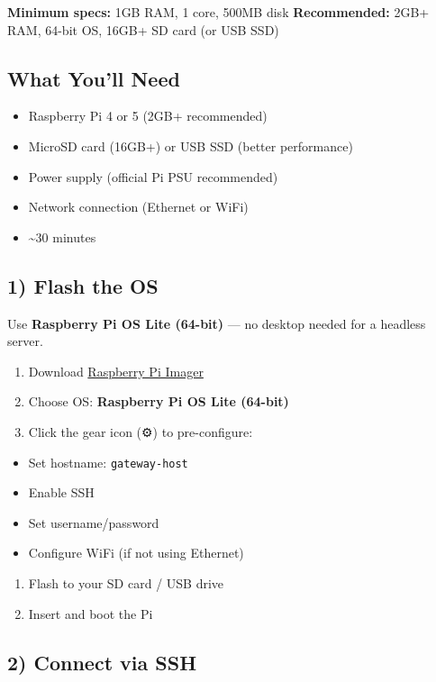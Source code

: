 \textbf{Minimum specs:} 1GB RAM, 1 core, 500MB disk
\textbf{Recommended:} 2GB+ RAM, 64-bit OS, 16GB+ SD card (or USB SSD)

\subsection{What You'll Need}


\begin{itemize}
  \item Raspberry Pi 4 or 5 (2GB+ recommended)
  \item MicroSD card (16GB+) or USB SSD (better performance)
  \item Power supply (official Pi PSU recommended)
  \item Network connection (Ethernet or WiFi)
  \item \textasciitilde{}30 minutes
\end{itemize}


\subsection{1) Flash the OS}


Use \textbf{Raspberry Pi OS Lite (64-bit)} — no desktop needed for a headless server.

\begin{enumerate}
  \item Download \href{https://www.raspberrypi.com/software/}{Raspberry Pi Imager}
  \item Choose OS: \textbf{Raspberry Pi OS Lite (64-bit)}
  \item Click the gear icon (⚙️) to pre-configure:
\end{enumerate}

\begin{itemize}
  \item Set hostname: \texttt{gateway-host}
  \item Enable SSH
  \item Set username/password
  \item Configure WiFi (if not using Ethernet)
\end{itemize}

\begin{enumerate}
  \item Flash to your SD card / USB drive
  \item Insert and boot the Pi
\end{enumerate}


\subsection{2) Connect via SSH}


